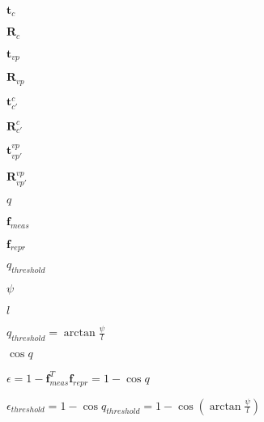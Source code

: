 \documentclass{article}
\begin{document}
$ \mathbf{t}_{c} $
\pagebreak

$ \mathbf{R}_{c} $
\pagebreak

$ \mathbf{t}_{vp} $
\pagebreak

$ \mathbf{R}_{vp} $
\pagebreak

$ \mathbf{t}_{c'}^{c} $
\pagebreak

$ \mathbf{R}_{c'}^{c} $
\pagebreak

$ \mathbf{t}_{vp'}^{vp} $
\pagebreak

$ \mathbf{R}_{vp'}^{vp} $
\pagebreak

$ q $
\pagebreak

$ \mathbf{f}_{meas} $
\pagebreak

$ \mathbf{f}_{repr} $
\pagebreak

$ q_{threshold} $
\pagebreak

$ \psi $
\pagebreak

$ l $
\pagebreak

$ q_{threshold} = \arctan{\frac{\psi}{l}} $
\pagebreak

$ \cos q $
\pagebreak

$ \epsilon = 1 - \mathbf{f}_{meas}^{T}\mathbf{f}_{repr} = 1 - \cos q $
\pagebreak

$ \epsilon_{threshold} = 1 - \cos{q_{threshold}} = 1 - \cos({\arctan{\frac{\psi}{l}}}) $
\pagebreak
\end{document}
